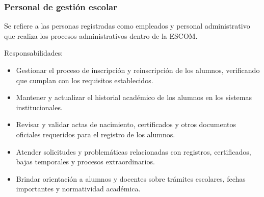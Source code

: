 \begin{Usuario}{\hypertarget{tPersonalGestion}{\subsubsection{Personal de gestión escolar}}}{
		Se refiere a las personas registradas como empleados y personal administrativo que realiza los procesos administrativos dentro de la ESCOM.
	}
	\item[Responsabilidades:] \cdtEmpty
	\begin{itemize}

		\item Gestionar el proceso de inscripción y reinscripción de los alumnos, verificando que cumplan con los requisitos establecidos.
		\item Mantener y actualizar el historial académico de los alumnos en los sistemas institucionales.
		\item Revisar y validar actas de nacimiento, certificados y otros documentos oficiales requeridos para el registro de los alumnos.
		\item Atender solicitudes y problemáticas relacionadas con registros, certificados, bajas temporales y procesos extraordinarios.
		\item Brindar orientación a alumnos y docentes sobre trámites escolares, fechas importantes y normatividad académica.
	\end{itemize}


\end{Usuario}


